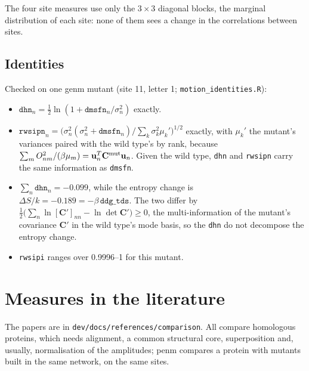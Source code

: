 \documentclass[11pt]{article}
\newcommand{\uu}{\mathbf{u}}
\newcommand{\CC}{\mathbf{C}}
\newcommand{\code}[1]{\texttt{#1}}
\begin{document}
The four site measures use only the $3\times3$ diagonal blocks, the marginal distribution of
each site: none of them sees a change in the correlations between sites.

\subsection{Identities}

Checked on one genm mutant (site 11, letter 1; \code{motion\_identities.R}):

\begin{itemize}
\item $\code{dhn}_n = \tfrac12\ln(1+\code{dmsfn}_n/\sigma_n^2)$ exactly.
\item $\code{rwsipn}_n = \bigl(\sigma_n^2(\sigma_n^2+\code{dmsfn}_n)/\sum_k\sigma_k^2\mu_k'\bigr)^{1/2}$
  exactly, with $\mu_k'$ the mutant's variances paired with the wild type's by rank,
  because $\sum_m O_{nm}^2/(\beta\mu_m) = \uu_n^T\CC^{\rm mut}\uu_n$.
  Given the wild type, \code{dhn} and \code{rwsipn} carry the same information as \code{dmsfn}.
\item $\sum_n\code{dhn}_n = -0.099$, while the entropy change is
  $\Delta S/k = -0.189 = -\beta\,\code{ddg\_tds}$.
  The two differ by $\tfrac12\bigl(\sum_n\ln[\CC']_{nn}-\ln\det\CC'\bigr)\ge0$, the
  multi-information of the mutant's covariance $\CC'$ in the wild type's mode basis, so the
  \code{dhn} do not decompose the entropy change.
\item \code{rwsipi} ranges over 0.9996--1 for this mutant.
\end{itemize}

\section{Measures in the literature}

The papers are in \code{dev/docs/references/comparison}.
All compare homologous proteins, which needs alignment, a common structural core,
superposition and, usually, normalisation of the amplitudes; penm compares a protein with
mutants built in the same network, on the same sites.
\end{document}

